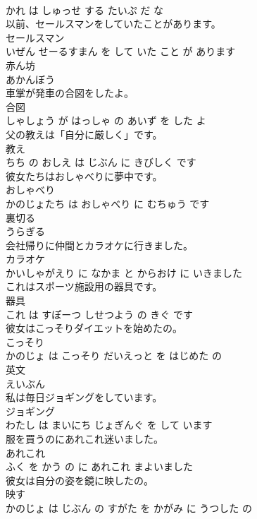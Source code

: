 \documentclass[8pt]{extreport}
\begin{document}
\begin{CJK}{UTF8}{min}
\\	かれ は しゅっせ する たいぷ だ な			
\\	以前、セールスマンをしていたことがあります。	
\\	セールスマン 
\\	いぜん せーるすまん を して いた こと が あります			
\\	赤ん坊	
\\	あかんぼう			
\\	車掌が発車の合図をしたよ。	
\\	合図 
\\	しゃしょう が はっしゃ の あいず を した よ			
\\	父の教えは「自分に厳しく」です。	
\\	教え 
\\	ちち の おしえ は じぶん に きびしく です			
\\	彼女たちはおしゃべりに夢中です。	
\\	おしゃべり 
\\	かのじょたち は おしゃべり に むちゅう です			
\\	裏切る	
\\	うらぎる			
\\	会社帰りに仲間とカラオケに行きました。	
\\	カラオケ 
\\	かいしゃがえり に なかま と からおけ に いきました			
\\	これはスポーツ施設用の器具です。	
\\	器具 
\\	これ は すぽーつ しせつよう の きぐ です			
\\	彼女はこっそりダイエットを始めたの。	
\\	こっそり 
\\	かのじょ は こっそり だいえっと を はじめた の			
\\	英文	
\\	えいぶん			
\\	私は毎日ジョギングをしています。	
\\	ジョギング 
\\	わたし は まいにち じょぎんぐ を して います			
\\	服を買うのにあれこれ迷いました。	
\\	あれこれ 
\\	ふく を かう の に あれこれ まよいました			
\\	彼女は自分の姿を鏡に映したの。	
\\	映す 
\\	かのじょ は じぶん の すがた を かがみ に うつした の			

\end{CJK}
\end{document}

